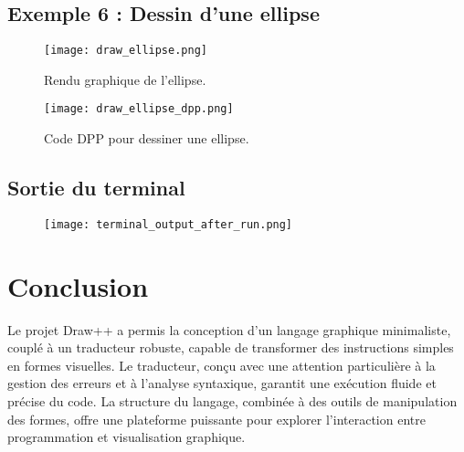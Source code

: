 \documentclass[12pt,a4paper]{report}
\begin{document}
\section{Exemple 6 : Dessin d'une ellipse}
\begin{figure}[H]
    \centering
    \texttt{[image: draw\_ellipse.png]}
    \caption{Rendu graphique de l'ellipse.}
    \texttt{[image: draw\_ellipse\_dpp.png]}
    \caption{Code DPP pour dessiner une ellipse.}
\end{figure}

\newpage

\section{Sortie du terminal}
\begin{figure}[H]
    \centering
    \texttt{[image: terminal\_output\_after\_run.png]}
\end{figure}

 \chapter{Conclusion}

Le projet Draw++ a permis la conception d'un langage graphique minimaliste, couplé à un traducteur robuste, capable de transformer des instructions simples en formes visuelles. Le traducteur, conçu avec une attention particulière à la gestion des erreurs et à l’analyse syntaxique, garantit une exécution fluide et précise du code. La structure du langage, combinée à des outils de manipulation des formes, offre une plateforme puissante pour explorer l'interaction entre programmation et visualisation graphique.
\end{document}
